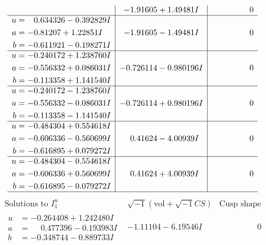 \documentclass[1p]{elsarticle_modified}
\theoremstyle{definition}
\newcommand{\I}{\sqrt{-1}}
\begin{document}
$$\begin{array}{c|c|c}
 & -1.91605 + 1.49481 I & \phantom{-0.000000 } 0 \\ \hline\begin{aligned}
u &= \phantom{-}0.634326 - 0.392829 I \\
a &= -0.81207 + 1.22851 I \\
b &= -0.611921 - 0.198271 I\end{aligned}
 & -1.91605 - 1.49481 I & \phantom{-0.000000 } 0 \\ \hline\begin{aligned}
u &= -0.240172 + 1.238760 I \\
a &= -0.556332 + 0.086031 I \\
b &= -0.113358 + 1.141540 I\end{aligned}
 & -0.726114 - 0.980196 I & \phantom{-0.000000 } 0 \\ \hline\begin{aligned}
u &= -0.240172 - 1.238760 I \\
a &= -0.556332 - 0.086031 I \\
b &= -0.113358 - 1.141540 I\end{aligned}
 & -0.726114 + 0.980196 I & \phantom{-0.000000 } 0 \\ \hline\begin{aligned}
u &= -0.484304 + 0.554618 I \\
a &= -0.606336 - 0.560699 I \\
b &= -0.616895 + 0.079272 I\end{aligned}
 & \phantom{-}0.41624 - 4.00939 I & \phantom{-0.000000 } 0 \\ \hline\begin{aligned}
u &= -0.484304 - 0.554618 I \\
a &= -0.606336 + 0.560699 I \\
b &= -0.616895 - 0.079272 I\end{aligned}
 & \phantom{-}0.41624 + 4.00939 I & \phantom{-0.000000 } 0\\
 \hline 
 \end{array}$$\newpage$$\begin{array}{c|c|c}  
\text{Solutions to }I^u_{1}& \I (\text{vol} + \sqrt{-1}CS) & \text{Cusp shape}\\
 \hline 
\begin{aligned}
u &= -0.264408 + 1.242480 I \\
a &= \phantom{-}0.477396 - 0.193983 I \\
b &= -0.348744 - 0.889733 I\end{aligned}
 & -1.11104 - 6.19546 I & \phantom{-0.000000 } 0 \\ \hline\begin{aligned}

\end{aligned}
\end{array}$$
\end{document}
